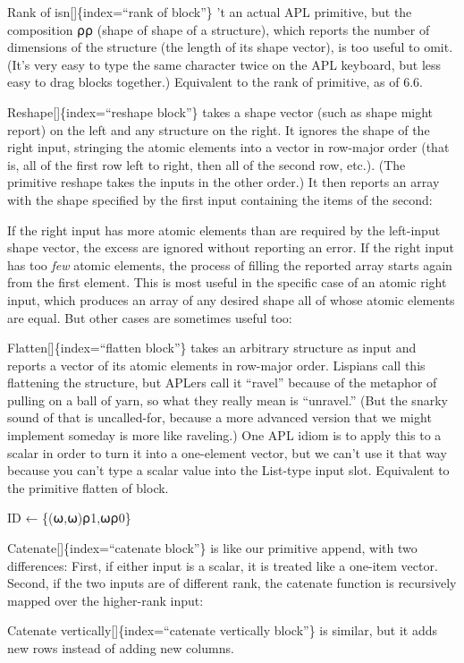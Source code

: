 \documentclass[
  letterpaper,
]{book}
\begin{document}
Rank of isn{[}{]}\{index=``rank of block''\} 't an actual APL primitive,
but the composition ⍴⍴ (shape of shape of a structure), which reports
the number of dimensions of the structure (the length of its shape
vector), is too useful to omit. (It's very easy to type the same
character twice on the APL keyboard, but less easy to drag blocks
together.) Equivalent to the rank of primitive, as of 6.6.

Reshape{[}{]}\{index=``reshape block''\} takes a shape vector (such as
shape might report) on the left and any structure on the right. It
ignores the shape of the right input, stringing the atomic elements into
a vector in row-major order (that is, all of the first row left to
right, then all of the second row, etc.). (The primitive reshape takes
the inputs in the other order.) It then reports an array with the shape
specified by the first input containing the items of the second:

If the right input has more atomic elements than are required by the
left-input shape vector, the excess are ignored without reporting an
error. If the right input has too \emph{few} atomic elements, the
process of filling the reported array starts again from the first
element. This is most useful in the specific case of an atomic right
input, which produces an array of any desired shape all of whose atomic
elements are equal. But other cases are sometimes useful too:

Flatten{[}{]}\{index=``flatten block''\} takes an arbitrary structure as
input and reports a vector of its atomic elements in row-major order.
Lispians call this flattening the structure, but APLers call it
``ravel'' because of the metaphor of pulling on a ball of yarn, so what
they really mean is ``unravel.'' (But the snarky sound of that is
uncalled-for, because a more advanced version that we might implement
someday is more like raveling.) One APL idiom is to apply this to a
scalar in order to turn it into a one-element vector, but we can't use
it that way because you can't type a scalar value into the List-type
input slot. Equivalent to the primitive flatten of block.

ID ← \{(⍵,⍵)⍴1,⍵⍴0\}

Catenate{[}{]}\{index=``catenate block''\} is like our primitive append,
with two differences: First, if either input is a scalar, it is treated
like a one-item vector. Second, if the two inputs are of different rank,
the catenate function is recursively mapped over the higher-rank input:

Catenate vertically{[}{]}\{index=``catenate vertically block''\} is
similar, but it adds new rows instead of adding new columns.
\end{document}

